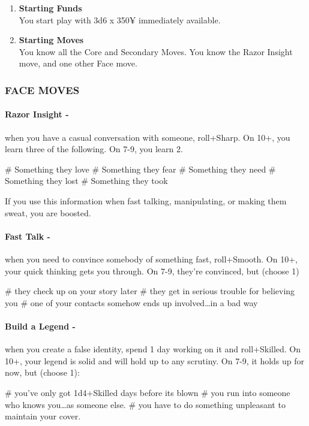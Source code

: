 \begin{enumerate}
    \item \textbf{Starting Funds} \\
    You start play with 3d6 x 350¥ immediately available.
    
    \item \textbf{Starting Moves} \\
    You know all the Core and Secondary Moves. You know the Razor Insight move, and one other Face move.
\end{enumerate}

\subsubsection{FACE MOVES}
\paragraph{Razor Insight -} when you have a casual conversation with someone, roll+Sharp. On 10+, you learn three of the following. On 7-9, you learn 2.
    \begin{easylist}
        # Something they love        
        # Something they fear        
        # Something they need        
        # Something they lost        
        # Something they took
    \end{easylist}
If you use this information when fast talking, manipulating, or making them sweat, you are boosted.

\paragraph{Fast Talk -} when you need to convince somebody of something fast, roll+Smooth. On 10+, your quick thinking gets you through. On 7-9, they’re convinced, but (choose 1)
    \begin{easylist}
        # they check up on your story later
        # they get in serious trouble for believing you
        # one of your contacts somehow ends up involved…in a bad way   
    \end{easylist}
        
\paragraph{Build a Legend -} when you create a false identity, spend 1 day working on it and roll+Skilled. On 10+, your legend is solid and will hold up to any scrutiny. On 7-9, it holds up for now, but (choose 1):
    \begin{easylist}
        # you've only got 1d4+Skilled days before its blown
        # you run into someone who knows you…as someone else.
        # you have to do something unpleasant to maintain your cover.
    \end{easylist}

